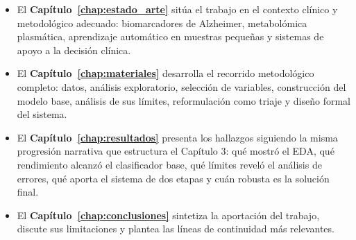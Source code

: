 \begin{itemize}
    \item El \textbf{Capítulo~\ref{chap:estado_arte}} sitúa el trabajo en el contexto clínico y metodológico adecuado: biomarcadores de Alzheimer, metabolómica plasmática, aprendizaje automático en muestras pequeñas y sistemas de apoyo a la decisión clínica.

    \item El \textbf{Capítulo~\ref{chap:materiales}} desarrolla el recorrido metodológico completo: datos, análisis exploratorio, selección de variables, construcción del modelo base, análisis de sus límites, reformulación como triaje y diseño formal del sistema.

    \item El \textbf{Capítulo~\ref{chap:resultados}} presenta los hallazgos siguiendo la misma progresión narrativa que estructura el Capítulo 3: qué mostró el EDA, qué rendimiento alcanzó el clasificador base, qué límites reveló el análisis de errores, qué aporta el sistema de dos etapas y cuán robusta es la solución final.

    \item El \textbf{Capítulo~\ref{chap:conclusiones}} sintetiza la aportación del trabajo, discute sus limitaciones y plantea las líneas de continuidad más relevantes.
\end{itemize}
